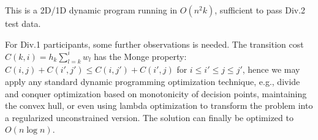 \documentclass[a4paper,10.5pt,twoside]{article}
\begin{document}
This is a 2D/1D dynamic program running in $O(n^2 k)$, sufficient to pass Div.2 test data. 

For Div.1 participants, some further observations is needed. The transition cost $C(k, i) = h_{k} \sum_{l = k}^i w_l$ has the Monge property: $C(i, j) + C(i', j') \leq C(i, j') + C(i', j)$ for $i \leq i' \leq j \leq j'$, hence we may apply any standard dynamic programming optimization technique, e.g., divide and conquer optimization based on monotonicity of decision points, maintaining the convex hull, or even using lambda optimization to transform the problem into a regularized unconstrained version. The solution can finally be optimized to $O(n \log n)$.
\end{document}
